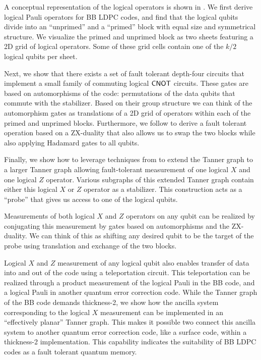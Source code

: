 \documentclass{article}
\begin{document}
A conceptual representation of the logical operators is shown in . We first derive logical Pauli operators for BB LDPC codes, and find that the logical qubits divide into an ``unprimed'' and a ``primed'' block with equal size and symmetrical structure. We visualize the primed and unprimed block as two sheets featuring a 2D grid of logical operators. Some of these grid cells contain one of the $k/2$ logical qubits per sheet. 


Next, we show that there exists a set of fault tolerant depth-four circuits that implement a small family of commuting logical $\mathsf{CNOT}$ circuits. These gates are based on automorphisms of the code: permutations of the data qubits that commute with the stabilizer. Based on their group structure we can think of the automorphism gates as translations of a 2D grid of operators within each of the primed and unprimed blocks. Furthermore, we follow  \cite{breuckmann2022foldtransversal} to derive a fault tolerant operation based on a ZX-duality that also allows us to swap the two blocks while also applying Hadamard gates to all qubits.





Finally, we show how to leverage techniques from \cite{cohen2022lowoverhead} to extend the Tanner graph to a larger Tanner graph allowing fault-tolerant measurement of one logical $X$ and one logical $Z$ operator. Various subgraphs of this extended Tanner graph contain either this logical $X$ or $Z$ operator as a stabilizer. This construction acts as a ``probe'' that gives us access to one of the logical qubits. 

Measurements of both logical $X$ and $Z$ operators on any qubit can be realized by conjugating this measurement by gates based on automorphisms and the ZX-duality. We can think of this as shifting any desired qubit to be the target of the probe using translation and exchange of the two blocks.

Logical $X$ and $Z$ measurement of any logical qubit also enables transfer of data into and out of the code using a teleportation circuit. This teleportation can be realized through a product measurement of the logical Pauli in the BB code, and a logical Pauli in another quantum error correction code. While the Tanner graph of the BB code demands thickness-2, we show how the ancilla system corresponding to the logical $X$ measurement can be implemented in an ``effectively planar'' Tanner graph. This makes it possible two connect this ancilla system to another quantum error correction code, like a surface code, within a thickness-2 implementation. This capability indicates the suitability of BB LDPC codes as a fault tolerant quantum memory.
\end{document}
